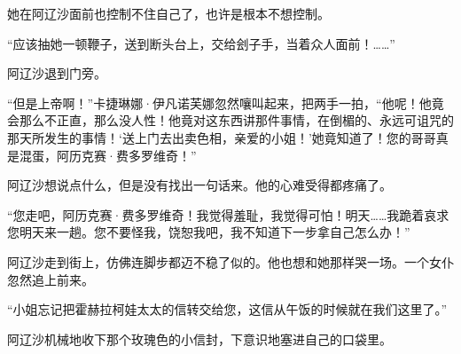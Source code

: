 \par 她在阿辽沙面前也控制不住自己了，也许是根本不想控制。
\par “应该抽她一顿鞭子，送到断头台上，交给刽子手，当着众人面前！……”
\par 阿辽沙退到门旁。
\par “但是上帝啊！”卡捷琳娜·伊凡诺芙娜忽然嚷叫起来，把两手一拍，“他呢！他竟会那么不正直，那么没人性！他竟对这东西讲那件事情，在倒楣的、永远可诅咒的那天所发生的事情！‘送上门去出卖色相，亲爱的小姐！’她竟知道了！您的哥哥真是混蛋，阿历克赛·费多罗维奇！”
\par 阿辽沙想说点什么，但是没有找出一句话来。他的心难受得都疼痛了。
\par “您走吧，阿历克赛·费多罗维奇！我觉得羞耻，我觉得可怕！明天……我跪着哀求您明天来一趟。您不要怪我，饶恕我吧，我不知道下一步拿自己怎么办！”
\par 阿辽沙走到街上，仿佛连脚步都迈不稳了似的。他也想和她那样哭一场。一个女仆忽然追上前来。
\par “小姐忘记把霍赫拉柯娃太太的信转交给您，这信从午饭的时候就在我们这里了。”
\par 阿辽沙机械地收下那个玫瑰色的小信封，下意识地塞进自己的口袋里。
